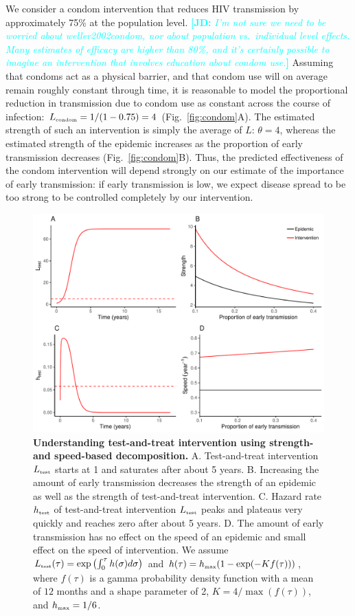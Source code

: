\documentclass[12pt]{article}\usepackage[]{graphicx}\usepackage[]{color}
\newcommand{\comment}[3]{\textcolor{#1}{\textbf{[#2: }\textit{#3}\textbf{]}}}
\newcommand{\jd}[1]{\comment{cyan}{JD}{#1}}
\newcommand{\tsub}[2]{#1_{{\textrm{\tiny #2}}}}
\newcommand{\figref}[1]{Fig.~\ref{fig:#1}}
\newcommand{\figlab}[1]{\label{fig:#1}}
\begin{document}
We consider a condom intervention that reduces HIV transmission by approximately 75\% at the population level. \jd{I'm not sure we need to be worried about weller2002condom, nor about population vs.~individual level effects. Many estimates of efficacy are higher than 80\%, and it's certainly possible to imagine an intervention that involves education about condom use.}
Assuming that condoms act as a physical barrier, and that condom use will on average remain roughly constant through time, it is reasonable to model the proportional reduction in transmission due to condom use as constant across the course of infection: $\tsub{L}{condom} = 1/(1-0.75) = 4$  (\figref{condom}A).
The estimated strength of such an intervention is simply the average of $L$: $\theta=4$, whereas the estimated strength of the epidemic increases as the proportion of early transmission decreases (\figref{condom}B).
Thus, the predicted effectiveness of the condom intervention will depend strongly on our estimate of the importance of early transmission: if early transmission is low, we expect disease spread to be too strong to be controlled completely by our intervention. 

\begin{figure}[!t]
\includegraphics[width=\textwidth]{../figure/figure3.pdf}
\caption{
\textbf{Understanding test-and-treat intervention using strength- and speed-based decomposition.}
A. Test-and-treat intervention $\tsub{L}{test}$ starts at 1 and saturates after about 5 years.
B. Increasing the amount of early transmission decreases the strength of an epidemic as well as the strength of test-and-treat intervention.
C. Hazard rate $\tsub{h}{test}$ of test-and-treat intervention $\tsub{L}{test}$ peaks and plateaus very quickly and reaches zero after about 5 years.
D. The amount of early transmission has no effect on the speed of an epidemic and small effect on the speed of intervention.
We assume $\tsub{L}{test}(\tau) = \exp\left(\int_0^\tau h(\sigma) d\sigma \right)$ and $h(\tau) = \tsub{h}{max} (1 - \exp(- K f(\tau)))$, where $f(\tau)$ is a gamma probability density function with a mean of $12$ months and a shape parameter of 2, $K = 4/\max(f(\tau))$, and $\tsub{h}{max} = 1/6$.
}
\figlab{test}
\end{figure}
\end{document}
